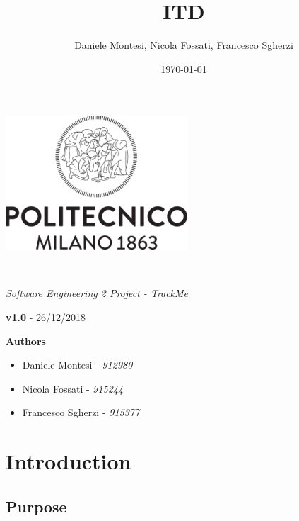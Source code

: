 \documentclass[a4paper,oneside,11pt]{article}
\title{ITD}
\author{Daniele Montesi, Nicola Fossati, Francesco Sgherzi}
\date{\today}
\begin{document}
    \begin{titlingpage} 
        \begin{center}
            \includegraphics[height=5cm]{assets/Logo_Politecnico_Milano.png}\\
            \vspace{4cm}
            \begin{huge} 
                \textbf{\thetitle} \\
            \end{huge}
            \vspace{0.3cm}
                    \begin{Large}
                \textit{Software Engineering 2 Project - TrackMe} \\
            \end{Large}
        \end{center}
         \textbf{v1.0} - 26/12/2018 \\

            \vspace{4cm}
             \begin{large}
            \textbf{Authors}
            \begin{itemize}
                \item Daniele Montesi - \textit{912980} 
                \item Nicola Fossati - \textit{915244}
                \item Francesco Sgherzi - \textit{915377}
            \end{itemize}
        \end{large}
    \end{titlingpage}
    \newpage
    \tableofcontents
    \newpage
    \section{Introduction}
    
        \subsection{Purpose}
            
\end{document}
